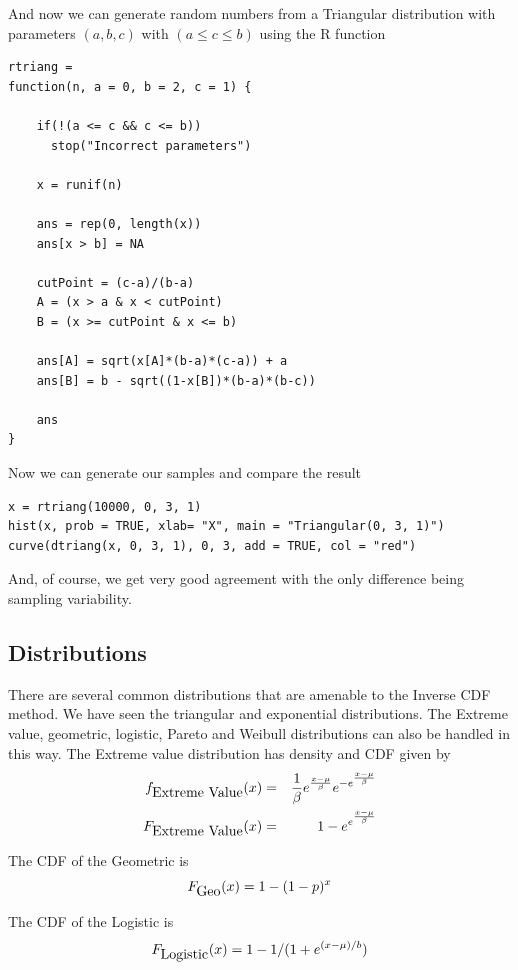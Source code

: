 \documentclass{article}
\begin{document}
And now we can generate random numbers from a Triangular
distribution with parameters $(a, b, c)$ with $(a \le c \le b)$
using the R function
\begin{verbatim}
rtriang =
function(n, a = 0, b = 2, c = 1) {

    if(!(a <= c && c <= b))
      stop("Incorrect parameters")

    x = runif(n)

    ans = rep(0, length(x))
    ans[x > b] = NA

    cutPoint = (c-a)/(b-a)
    A = (x > a & x < cutPoint)
    B = (x >= cutPoint & x <= b)

    ans[A] = sqrt(x[A]*(b-a)*(c-a)) + a
    ans[B] = b - sqrt((1-x[B])*(b-a)*(b-c)) 

    ans
}
\end{verbatim}

Now we can generate our samples and compare the
result
\begin{verbatim}
x = rtriang(10000, 0, 3, 1)
hist(x, prob = TRUE, xlab= "X", main = "Triangular(0, 3, 1)")
curve(dtriang(x, 0, 3, 1), 0, 3, add = TRUE, col = "red")
\end{verbatim}
And, of course,  we get very good agreement with 
the only difference being sampling variability.


\subsection{Distributions}
There are several common distributions that are amenable to the
Inverse CDF method.  We have seen the triangular and exponential
distributions.  The Extreme value, geometric, logistic, Pareto and
Weibull distributions can also be handled in this way.
The Extreme value distribution has density and CDF given
by
\begin{eqnarray*}
f_{\hbox{Extreme Value}}(x) &=& \frac{1}{\beta}e^\frac{x-\mu}{\beta}e^{-e^{\frac{x-\mu}{\beta}}} \\
F_{\hbox{Extreme Value}}(x) &=& 1 - e^{e^\frac{x - \mu}{\beta}}  
\end{eqnarray*}

The CDF of the Geometric is
\begin{equation}
  F_{\hbox{Geo}}(x) = 1 - (1-p)^x
\end{equation}


The CDF of the Logistic is
\begin{equation}
  F_{\hbox{Logistic}}(x) = 1 - 1/(1 + e^{(x - \mu)/b})
\end{equation}
\end{document}
